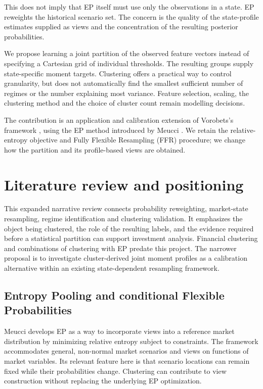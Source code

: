 \documentclass[11pt,a4paper]{article}
\begin{document}
This does not imply that EP itself must use only the observations in a state. EP reweights the historical scenario set. The concern is the quality of the state-profile estimates supplied as views and the concentration of the resulting posterior probabilities.

We propose learning a joint partition of the observed feature vectors instead of specifying a Cartesian grid of individual thresholds. The resulting groups supply state-specific moment targets. Clustering offers a practical way to control granularity, but does not automatically find the smallest sufficient number of regimes or the number explaining most variance. Feature selection, scaling, the clustering method and the choice of cluster count remain modelling decisions.

The contribution is an application and calibration extension of Vorobets's framework \cite{vorobets2025}, using the EP method introduced by Meucci \cite{meucci2008}. We retain the relative-entropy objective and Fully Flexible Resampling (FFR) procedure; we change how the partition and its profile-based views are obtained.

\section{Literature review and positioning}
\label{sec:literature}

This expanded narrative review connects probability reweighting, market-state resampling, regime identification and clustering validation. It emphasizes the object being clustered, the role of the resulting labels, and the evidence required before a statistical partition can support investment analysis. Financial clustering and combinations of clustering with EP predate this project. The narrower proposal is to investigate cluster-derived joint moment profiles as a calibration alternative within an existing state-dependent resampling framework.

\subsection{Entropy Pooling and conditional Flexible Probabilities}

Meucci \cite{meucci2008} develops EP as a way to incorporate views into a reference market distribution by minimizing relative entropy subject to constraints. The framework accommodates general, non-normal market scenarios and views on functions of market variables. Its relevant feature here is that scenario locations can remain fixed while their probabilities change. Clustering can contribute to view construction without replacing the underlying EP optimization.
\end{document}
